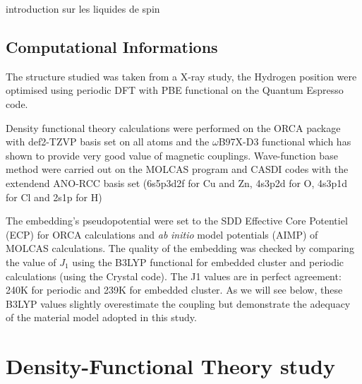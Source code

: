 \documentclass[10pt]{report}
\numberwithin{equation}{section}
\begin{document}
introduction sur les liquides de spin

\subsection*{Computational Informations}

The structure studied was taken from a X-ray study, the Hydrogen position were optimised using periodic DFT with PBE functional on the Quantum Espresso code.

Density functional theory calculations were performed on the ORCA package with def2-TZVP basis set on all atoms and the $\omega$B97X-D3 functional which has shown to provide very good value of magnetic couplings.
Wave-function base method were carried out on the MOLCAS program and CASDI codes with the extendend ANO-RCC basis set (6s5p3d2f for Cu and Zn, 4s3p2d
for O, 4s3p1d for Cl and 2s1p for H)

The embedding's pseudopotential were set to the SDD Effective Core Potentiel (ECP) for ORCA calculations and \textit{ab} \textit{initio} model potentials (AIMP) of MOLCAS calculations. 
The quality of the embedding was checked by comparing the value of $J_1$ using the B3LYP functional for embedded cluster and periodic calculations (using the Crystal code). 
The J1 values are in perfect agreement: 240K for periodic and 239K for embedded cluster. 
As we will see below, these B3LYP values slightly overestimate the coupling but demonstrate the adequacy of the material model adopted in this study.

\section{Density-Functional Theory study}
\end{document}
